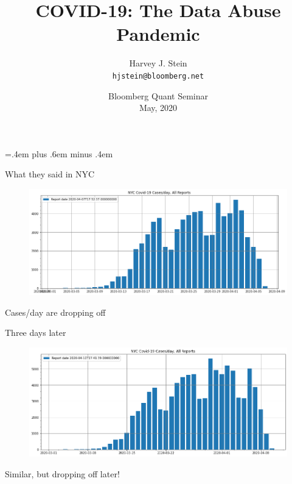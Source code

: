 \documentclass[aspectratio=169]{beamer}
\title{COVID-19: The Data Abuse Pandemic}
\author[Harvey J. Stein]{Harvey J. Stein\\\texttt{hjstein@bloomberg.net}}
\institute[Bloomberg LP]
{
  Head, Quantitative Risk Analytics\\
  Bloomberg L.P.
}
\date{Bloomberg Quant Seminar\\
  May, 2020}
\begin{document}
\nocite{nyc2020data,Stein2020nycdata,Stein2020owiddata,owid2020data}
\nocite{Stein2020Seem,Stein2020Ray,owid2020data,JHU2020data}
\nocite{NYT2020data}

\parskip=.4em plus .6em minus .4em

\begin{frame}

  \titlepage


\end{frame}

\begin{frame}{What they said in NYC}
  \begin{figure}
    \centering
    \includegraphics[width=1\textwidth]{../Notebooks/casesPerDay2020-04-07T17_52_37.000000000.png}
  \end{figure}
  Cases/day are dropping off
\end{frame}

\begin{frame}{Three days later}
  \begin{figure}
    \centering
    \includegraphics[width=1\textwidth]{../Notebooks/casesPerDay2020-04-10T17_41_39.000000000.png}
  \end{figure}
  Similar, but dropping off later!
\end{frame}
\end{document}
